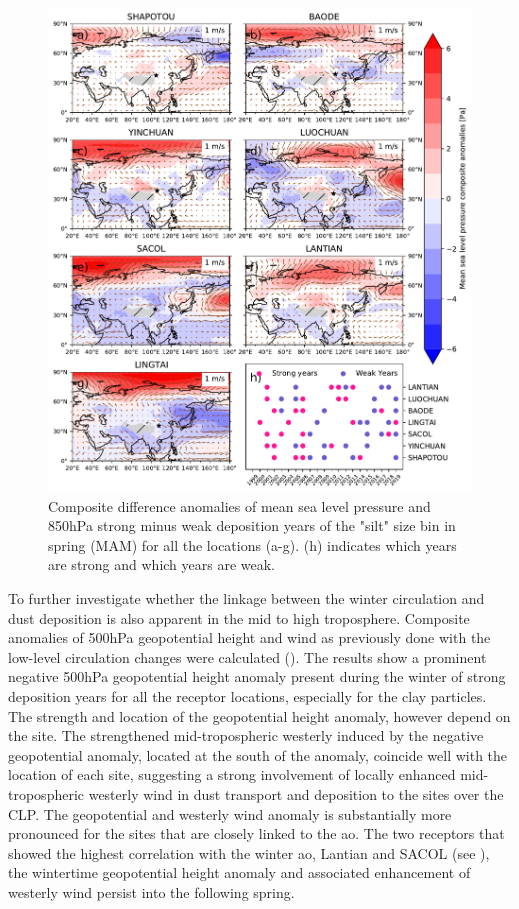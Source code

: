 \begin{figure}[htbp]
    \centering
    \includegraphics[width=\textwidth]{texfiles/figs/mslp_850hPa_20micron_MAM.pdf}
    \caption{Composite difference anomalies of mean sea level pressure and 850hPa strong minus weak deposition years of the "silt" size bin in spring (MAM) for all the locations (a-g).  (h) indicates which years are strong and which years are weak.}
    \label{fig:MAM_850_coarse_composite}
\end{figure}

To further investigate whether the linkage between the winter circulation and dust deposition is also apparent in the mid to high troposphere.
Composite anomalies of 500hPa geopotential height and wind as previously done with the low-level circulation changes were calculated ().
The results show a prominent negative 500hPa geopotential height anomaly present during the winter of strong deposition years for all the receptor locations, especially for the clay particles.
The strength and location of the geopotential height anomaly, however depend on the site. The strengthened mid-tropospheric westerly induced by the negative geopotential anomaly, located at the south of the anomaly, coincide well with the location of each site, suggesting a strong involvement of locally enhanced mid-tropospheric westerly wind in dust transport and deposition to the sites over the CLP. 
The geopotential and westerly wind anomaly is substantially more pronounced for the sites that are closely linked to the \acrshort{ao}. The two receptors that showed the highest correlation with the winter \acrshort{ao}, Lantian and SACOL (see ), the wintertime geopotential height anomaly and associated enhancement of westerly wind persist into the following spring.      

